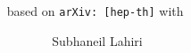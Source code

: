 \documentclass{beamer}
\title{}
\subtitle{\small{based on \texttt{arXiv: [hep-th]} with }}
\author{Subhaneil Lahiri\inst{1,2}}
\institute[Harvard and TIFR]{%
\inst{1}Harvard University
\and
\inst{2}Tata Institute of Fundamental Research
}
\begin{document}

\begin{frame}
%
 \titlepage
%
\end{frame}

\section{}


\begin{frame}{}
%
 
%
\end{frame}



\end{document}
